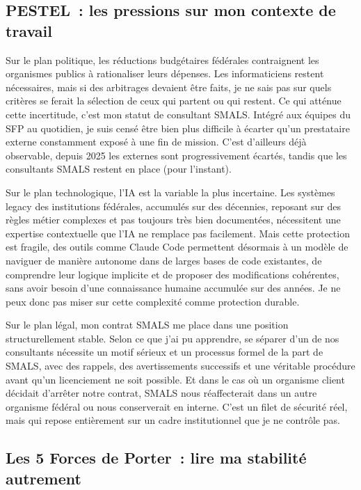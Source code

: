 \documentclass[12pt, a4paper]{article}
\begin{document}
\subsection{PESTEL~: les pressions sur mon contexte de travail}

Sur le plan politique, les réductions budgétaires fédérales 
contraignent les organismes publics à rationaliser leurs 
dépenses. Les informaticiens restent nécessaires, mais si 
des arbitrages devaient être faits, je ne sais pas sur quels 
critères se ferait la sélection de ceux qui partent ou qui 
restent. Ce qui atténue cette incertitude, c'est mon statut 
de consultant SMALS. Intégré aux équipes du SFP au 
quotidien, je suis censé être bien plus difficile à écarter 
qu'un prestataire externe constamment exposé à une fin de 
mission. C'est d'ailleurs déjà observable, depuis 2025 les externes 
sont progressivement écartés, tandis que les consultants 
SMALS restent en place (pour l'instant).

Sur le plan technologique, l'IA est la variable 
la plus incertaine. Les systèmes legacy des institutions 
fédérales, accumulés sur des décennies, reposant sur des 
règles métier complexes et pas toujours très bien documentées, 
nécessitent une expertise contextuelle que l'IA ne remplace 
pas facilement. Mais cette protection est fragile, des outils 
comme Claude Code permettent désormais à un modèle de 
naviguer de manière autonome dans de larges bases de code 
existantes, de comprendre leur logique implicite et de 
proposer des modifications cohérentes, sans avoir besoin 
d'une connaissance humaine accumulée sur des années. 
Je ne peux donc pas miser sur cette complexité comme 
protection durable.

Sur le plan légal, mon contrat SMALS me place dans une 
position structurellement stable. Selon ce que j'ai pu 
apprendre, se séparer d'un de nos consultants nécessite 
un motif sérieux et un processus formel de la part de SMALS, avec des rappels, 
des avertissements successifs et une véritable procédure avant 
qu'un licenciement ne soit possible. Et dans le cas où un organisme 
client décidait d'arrêter notre contrat, SMALS nous 
réaffecterait dans un autre organisme fédéral ou 
nous conserverait en interne. C'est un filet 
de sécurité réel, mais qui repose entièrement sur un cadre 
institutionnel que je ne contrôle pas.

\subsection{Les 5 Forces de Porter~: lire ma stabilité autrement}
\end{document}
